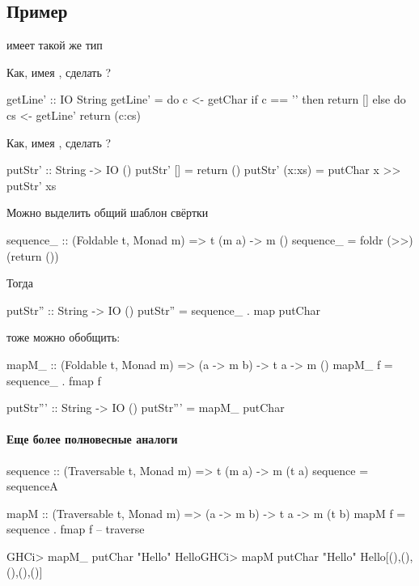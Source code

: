 \documentclass[11pt,a4paper]{article}
\begin{document}
\subsection{Пример}
 имеет такой же тип 
Как, имея , сделать ?
\begin{hscode}
getLine' :: IO String
getLine' = do
	c <- getChar
	if c == '\n' then
		return []
	else do
		cs <- getLine'
		return (c:cs)
\end{hscode}
Как, имея , сделать ?
\begin{hscode}
putStr' :: String -> IO ()
putStr' [] = return ()
putStr' (x:xs) = putChar x >> putStr' xs
\end{hscode}
Можно выделить общий шаблон свёртки
\begin{hscode}
sequence_ :: (Foldable t, Monad m) => t (m a) -> m ()
sequence_ = foldr (>>) (return ())
\end{hscode}
Тогда
\begin{hscode}
putStr'' :: String -> IO ()
putStr'' = sequence_ . map putChar
\end{hscode}
 тоже можно обобщить:
\begin{hscode}
mapM_ :: (Foldable t, Monad m) => (a -> m b) -> t a -> m ()
mapM_ f = sequence_ . fmap f

putStr''' :: String -> IO ()
putStr''' = mapM_ putChar
\end{hscode}

\paragraph{Еще более полновесные аналоги}
\begin{hscode}
sequence :: (Traversable t, Monad m) => t (m a) -> m (t a)
sequence = sequenceA

mapM :: (Traversable t, Monad m) => (a -> m b) -> t a -> m (t b)
mapM f = sequence . fmap f  -- traverse

GHCi> mapM_ putChar "Hello"
HelloGHCi> mapM putChar "Hello"
Hello[(),(),(),(),()]
\end{hscode}
\end{document}

